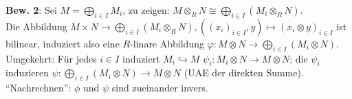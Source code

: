 \begin{Bew}
\begin{enumerate}
\textbf{Bew. 2}: Sei $M=\bigoplus_{i\in I} M_i$, zu zeigen: $M\otimes_R N \cong \bigoplus_{i\in I}(M_i\otimes_R N)$.\\
Die Abbildung $M\times N \to \bigoplus_{i\in I} (M_i\otimes_R N), \left((x_i)_{i \in I}, y\right)\mapsto (x_i\otimes y)_{i\in I}$ ist bilinear, induziert
also eine $R$-linare Abbildung $\varphi: M\otimes N\to \bigoplus_{i\in I}(M_i\otimes N)$.\\
Umgekehrt: F\"ur jedes $i\in I$ induziert $M_i\hookrightarrow M$ $\psi_i : M_i\otimes N\to M\otimes N$;
die $\psi_i$ induzieren $\psi:\bigoplus_{i\in I}(M_i\otimes N)\to M\otimes N$ (UAE der direkten Summe).
``Nachrechnen'': $\phi$ und $\psi$ sind zueinander invers. 
\end{enumerate}
\end{Bew}

